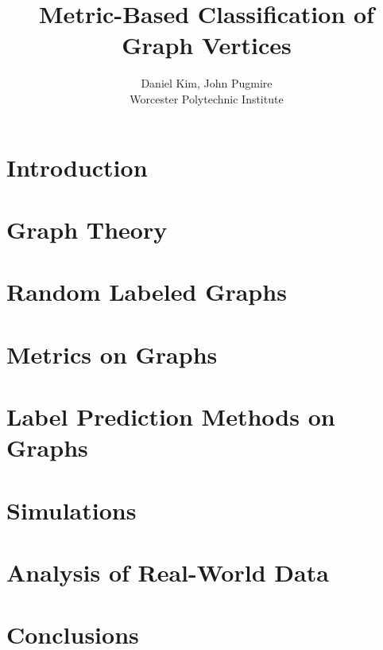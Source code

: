 \documentclass[11pt,oneside]{report}
\theoremstyle{definition}
\begin{document}
\title{Metric-Based Classification of Graph Vertices}
\author{Daniel Kim, John Pugmire\\Worcester Polytechnic Institute\\}
\maketitle
\tableofcontents


\chapter{Introduction}
\label{chap:intro}



\chapter{Graph Theory}
\label{chap:graph_theory}



\chapter{Random Labeled Graphs}
\label{chap:random_graphs}



\chapter{Metrics on Graphs}
\label{chap:metrics}



\chapter{Label Prediction Methods on Graphs}
\label{chap:prediction}



\chapter{Simulations}
\label{chap:simulations}



\chapter{Analysis of Real-World Data}
\label{chap:real_world}



\chapter{Conclusions}
\label{chap:conclusions}





\end{document}
